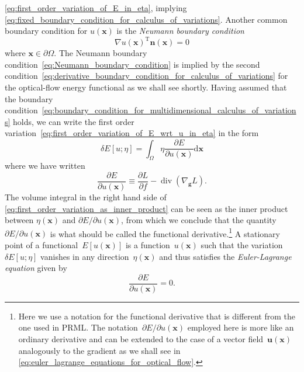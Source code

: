 \documentclass[12pt,a4paper]{article}
\begin{document}
\eqref{eq:first_order_variation_of_E_in_eta},
implying \eqref{eq:fixed_boundary_condition_for_calculus_of_variations}.
Another common boundary condition for $u(\mathbf{x})$ is the \emph{Neumann boundary condition}
\begin{equation}
{\nabla u(\mathbf{x})}^{\operatorname{T}} \mathbf{n}(\mathbf{x}) = 0
\label{eq:Neumann_boundary_condition}
\end{equation}
where $\mathbf{x} \in \partial\Omega$.
The Neumann boundary condition~\eqref{eq:Neumann_boundary_condition} is implied by
the second condition~\eqref{eq:derivative_boundary_condition_for_calculus_of_variations}
for the optical-flow energy functional as we shall see shortly.
Having assumed that
the boundary condition~\eqref{eq:boundary_condition_for_multidimensional_calculus_of_variations}
holds, we can write the first order variation~\eqref{eq:first_order_variation_of_E_wrt_u_in_eta}
in the form
\begin{equation}
\delta E[u; \eta] = \int_{\Omega} \eta \frac{\partial E}{\partial u(\mathbf{x})}
\mathrm{d}\mathbf{x}
\label{eq:first_order_variation_as_inner_product}
\end{equation}
where we have written
\begin{equation}
\frac{\partial E}{\partial u(\mathbf{x})} \equiv
\frac{\partial L}{ \partial f} - \operatorname{div}\left( \nabla_{\mathbf{g}} L \right) .
\label{eq:multidimensional_functional_derivative}
\end{equation}
The volume integral in the right hand side of
\eqref{eq:first_order_variation_as_inner_product} can be seen as the inner product between
$\eta(\mathbf{x})$ and $\partial E/\partial u(\mathbf{x})$,
from which we conclude that the quantity~$\partial E/\partial u(\mathbf{x})$ is
what should be called the functional derivative.\footnote{Here we use a notation for
the functional derivative that is different from the one used in PRML.
The notation~$\partial E/\partial u(\mathbf{x})$ employed here is more like an ordinary derivative
and can be extended to the case of a vector field~$\mathbf{u}(\mathbf{x})$ analogously to
the gradient as we shall see in \eqref{eq:euler_lagrange_equations_for_optical_flow}.}
A stationary point of a functional~$E[u(\mathbf{x})]$ is a function~$u(\mathbf{x})$ such that
the variation~$\delta E[u; \eta]$ vanishes in any direction~$\eta(\mathbf{x})$ and thus
satisfies the \emph{Euler-Lagrange equation} given by
\begin{equation}
\frac{\partial E}{\partial u(\mathbf{x})} = 0 .
\label{eq:euler_lagrange_equation}
\end{equation}
\end{document}
